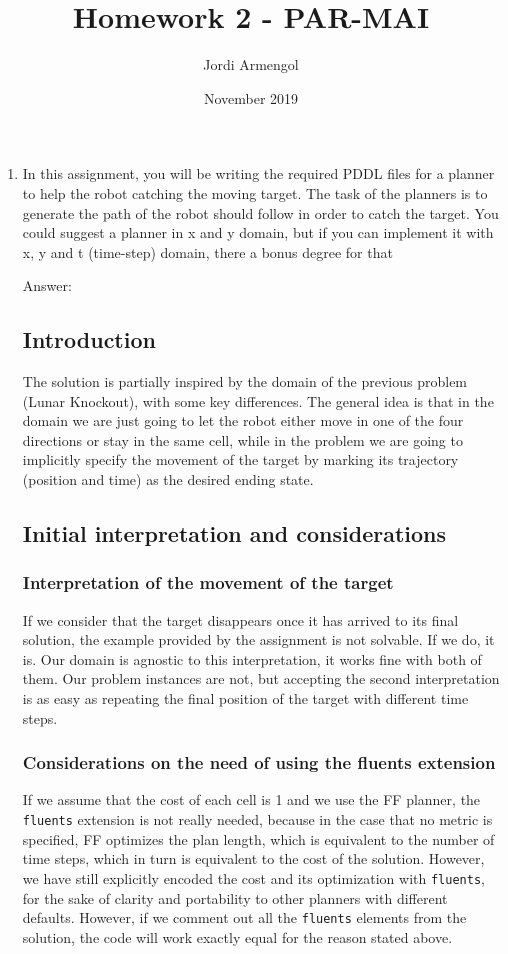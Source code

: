 \documentclass{article}
\title{Homework 2 - PAR-MAI}
\author{Jordi Armengol}
\date{November 2019}
\begin{document}
\maketitle

\begin{enumerate}
    \item 
In this assignment, you will be writing the required PDDL files for a planner to help the robot catching the moving target. The task of the planners is to generate the path of the robot should follow in order to catch the target. You could suggest a planner in x and y domain, but if you can implement it with x, y and t (time-step) domain, there a bonus degree for that

Answer:

\subsection*{Introduction}
The solution is partially inspired by the domain of the previous problem (Lunar Knockout), with some key differences. The general idea is that in the domain we are just going to let the robot either move in one of the four directions or stay in the same cell, while in the problem we are going to implicitly specify the movement of the target by marking its trajectory (position and time) as the desired ending state.
\subsection*{Initial interpretation and considerations}
\subsubsection*{Interpretation of the movement of the target}

If we consider that the target disappears once it has arrived to its final solution, the example provided by the assignment is not solvable. If we do, it is. Our domain is agnostic to this interpretation, it works fine with both of them. Our problem instances are not, but accepting the second interpretation is as easy as repeating the final position of the target with different time steps.
\subsubsection*{Considerations on the need of using the fluents extension}
If we assume that the cost of each cell is 1 and we use the FF planner, the \texttt{fluents} extension is not really needed, because in the case that no metric is specified, FF optimizes the plan length, which is equivalent to the number of time steps, which in turn is equivalent to the cost of the solution. However, we have still explicitly encoded the cost and its optimization with \texttt{fluents}, for the sake of clarity and portability to other planners with different defaults. However, if we comment out all the \texttt{fluents} elements from the solution, the code will work exactly equal for the reason stated above.


\end{enumerate}
\end{document}
